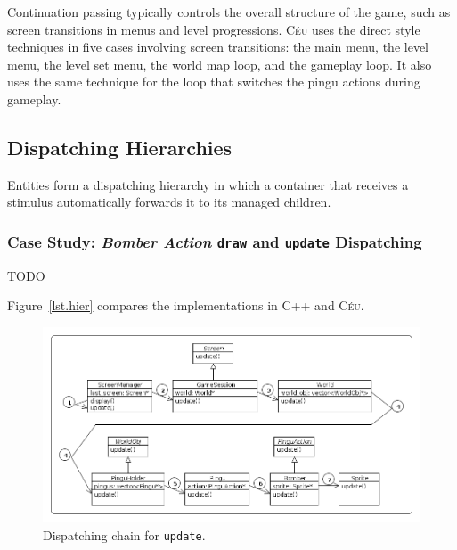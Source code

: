 \documentclass{vgtc}                          %
\newcommand{\CEU}{\textsc{C\'{e}u}\xspace}
\newcommand{\code}[1] {{\small{\texttt{#1}}}}
\begin{document}
Continuation passing typically controls the overall structure of the game,
such as screen transitions in menus and level progressions.
%
\CEU uses the direct style techniques in five cases involving screen
transitions:
the main menu, the level menu, the level set menu, the world map loop, and
the gameplay loop.
%
It also uses the same technique for the loop that switches the pingu actions
during gameplay.

\subsection{Dispatching Hierarchies}
\label{sec.pats.dispatching}

    Entities form a dispatching hierarchy in which a container that receives a
    stimulus automatically forwards it to its managed children.

\subsubsection{Case Study: \emph{Bomber Action} \code{draw} and \code{update} Dispatching}

TODO

Figure~\ref{lst.hier} compares the implementations in C++ and \CEU.

\begin{figure}[t]
\centering
\includegraphics[width=\columnwidth]{hierarchy}
\caption{Dispatching chain for \code{update}.
\label{fig.hier}
}
\end{figure}
\end{document}
